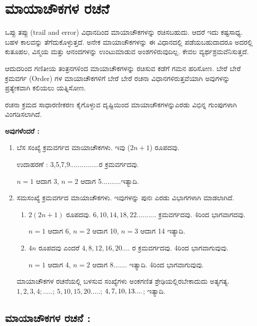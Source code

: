 \chapter{ಮಾಯಾಚೌಕಗಳ ರಚನೆ}

ಒಪ್ಪು ತಪ್ಪು (trail and error) ವಿಧಾನದಿಂದ ಮಾಯಾಚೌಕಗಳನ್ನು ರಚಿಸಬಹುದು. ಆದರೆ ಇದು ಕಷ್ಟಸಾಧ್ಯ. ಬಹಳ ಕಾಲವನ್ನು ತೆಗೆದುಕೊಳ್ಳುತ್ತದೆ. ಅನೇಕ ಮಾಯಾಚೌಕಗಳನ್ನು ಈ ವಿಧಾನದಲ್ಲಿ ಪಡೆಯಬಹುದಾದರೂ ಅದರಲ್ಲಿ ಕುತೂಹಲ, ವಿಸ್ಮಯ ಮತ್ತು ಆನಂದಗಳನ್ನು ಉಂಟುಮಾಡುವ ಅಂಶಗಳಿರುವುದಿಲ್ಲ. ಕೇವಲ ವ್ಯರ್ಥಶ್ರಮವೆನಿಸುತ್ತದೆ.

ಆದುದರಿಂದ ಗಣಿತೀಯ ತಂತ್ರನಗಳಿಂದ ಮಾಯಾಚೌಕಗಳನ್ನು ರಚಿಸುವ ಕಡೆಗೆ ಗಮನ ಹರಿಸೋಣ. ಬೇರೆ ಬೇರೆ ಕ್ರಮವರ್ಗ (Order) ಗಳ ಮಾಯಾಚೌಕಗಳಿಗೆ ಬೇರೆ ಬೇರೆ ರಚನಾ ವಿಧಾನಗಳಿರುತ್ತವೆಯಾಗಿ ಅವುಗಳನ್ನು ಪ್ರತ್ಯೇಕವಾಗಿ ಕಲಿಯಲು ಯತ್ನಿಸೋಣ.

ರಚನಾ ಕ್ರಮದ ಸಾಧಾರಣೀಕರಣ ಕೈಗೊಳ್ಳುವ ದೃಷ್ಟಿಯಿಂದ ಮಾಯಾಚೌಕಗಳನ್ನು\break ಎರಡು ವಿಭಿನ್ನ ಗುಂಪುಗಳಾಗಿ ವಿಂಗಡಿಸಲಾಗಿದೆ.


\medskip

\noindent \textbf{ಅವುಗಳೆಂದರೆ :}

\begin{enumerate}
	\item ಬೆಸ ಸಂಖ್ಯೆ ಕ್ರಮವರ್ಗದ ಮಾಯಾಚೌಕಗಳು. ಇವು ($2n+1$) ರೂಪದವು.

	ಉದಾಹರಣೆ : 3,5,7,9...............ರ ಕ್ರಮವರ್ಗದವು.

	$n=1$ ಆದಾಗ 3, $n=2$ ಆದಾಗ 5..........ಇತ್ಯಾದಿ.
	\item ಸಮಸಂಖ್ಯೆ ಕ್ರಮವರ್ಗದ ಮಾಯಾಚೌಕಗಳು. ಇವುಗಳನ್ನು ಪುನಃ ಎರಡು ವಿಭಾಗಗಳಾಗಿ ಮಾಡಲಾಗಿದೆ.
	\begin{enumerate}
		\item $2(2n+1)$ ರೂಪದವು. $6,10,14,18,22..........$ ಕ್ರಮವರ್ಗದವು. 4ರಿಂದ ಭಾಗವಾಗದವು.

		$n=1$ ಆದಾಗ 6, $n=2$ ಆದಾಗ 10, $n=3$ ಆದಾಗ 14 ಇತ್ಯಾದಿ.

		\item $4n$ ರೂಪದವು ಎಂದರೆ $4,8,12,16,20....$ ರ ಕ್ರಮವರ್ಗದವು. 4ರಿಂದ ಭಾಗ\-ವಾಗುವುವು.

		$n=1$ ಆದಾಗ 4, $n=2$ ಆದಾಗ $8.......$ ಇತ್ಯಾದಿ. 4ರಿಂದ ಭಾಗ\-ವಾಗುವುವು.
	\end{enumerate}
	ಮಾಯಾಚೌಕಗಳ ರಚನೆಯಲ್ಲಿ ಬಳಸುವ ಸಂಖ್ಯೆಗಳು ಅಂಕಗಣಿತ ಶ್ರೇಢಿಯಲ್ಲಿರ\break ಬೇಕಾದುದು ಅತ್ಯಗತ್ಯ. $1,2,3,4; .....$; $5,10,15,20.....$; $4,7,10,\break 13....$; ಇತ್ಯಾದಿ.
\end{enumerate}

\newpage

\section*{ಮಾಯಾಚೌಕಗಳ ರಚನೆ :}

